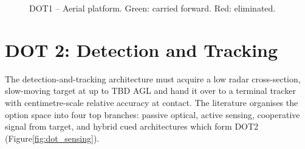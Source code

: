 \begin{figure}[H]
\centering
{}
\caption{DOT1 -- Aerial platform. Green: carried forward. Red: eliminated.}
\label{fig:dot_platform}
\end{figure}

\section{DOT 2: Detection and Tracking}
\label{sec:dot_sensing}

The detection-and-tracking architecture must acquire a low radar cross-section,  slow-moving target at up to TBD AGL and hand it over to a terminal tracker with centimetre-scale relative accuracy at contact. The literature organises the option space into four top branches: passive optical, active sensing, cooperative signal from target, and hybrid cued architectures which form DOT2 (Figure\ref{fig:dot_sensing}).


